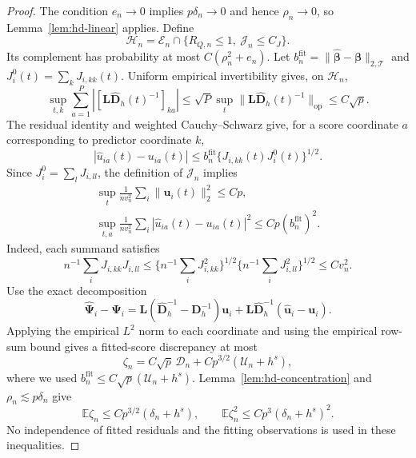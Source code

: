 \documentclass[12pt]{article}
\newcommand{\bu}{{\mathbf u}}
\newcommand{\bD}{{\mathbf D}}
\newcommand{\bL}{{\mathbf L}}
\newcommand{\bbeta}  {\boldsymbol{\beta}}
\newcommand{\bPsi} {\boldsymbol{\Psi}}
\newcommand{\expect}{\mathbb{E}}
\numberwithin{equation}{section}
\begin{document}
\begin{proof}
The condition $e_n\to0$ implies $p\delta_n\to0$ and hence
$\rho_n\to0$, so
Lemma~\ref{lem:hd-linear} applies.  Define
\[
\mathcal H_n=\mathcal E_n\cap\{R_{Q,n}\le1,
\ \mathcal J_n\le C_J\}.
\]
Its complement has probability at most $C(\rho_n^2+e_n)$.
Let $b_n^{\mathrm{fit}}=
\|\widehat{\bbeta}-\bbeta\|_{2,\mathcal T}$ and
$J_i^0(t)=\sum_kJ_{i,kk}(t)$.
Uniform empirical invertibility gives, on $\mathcal H_n$,
\[
\sup_{t,k}\sum_{a=1}^P|[\bL\widehat{\bD}_h(t)^{-1}]_{ka}|
\le\sqrt P\sup_t\|\bL\widehat{\bD}_h(t)^{-1}\|_{\mathrm{op}}
\le C\sqrt p.
\]
The residual identity and weighted Cauchy--Schwarz give, for a score
coordinate $a$ corresponding to predictor coordinate $k$,
\[
|\widehat u_{ia}(t)-u_{ia}(t)|
\le b_n^{\mathrm{fit}}\{J_{i,kk}(t)J_i^0(t)\}^{1/2}.
\]
Since $J_i^0=\sum_lJ_{i,ll}$, the definition of $\mathcal J_n$ implies
\[
\begin{gathered}
\sup_t\frac1{nv_n^2}\sum_i\|\bu_i(t)\|_2^2\le Cp,\\
\sup_{t,a}\frac1{nv_n^2}\sum_i
|\widehat u_{ia}(t)-u_{ia}(t)|^2
\le Cp(b_n^{\mathrm{fit}})^2.
\end{gathered}
\]
Indeed, each summand satisfies
\[
n^{-1}\sum_iJ_{i,kk}J_{i,ll}
\le \{n^{-1}\sum_iJ_{i,kk}^2\}^{1/2}
\{n^{-1}\sum_iJ_{i,ll}^2\}^{1/2}\le Cv_n^2.
\]
Use the exact decomposition
\[
\widehat{\bPsi}_i-\bPsi_i
=\bL(\widehat{\bD}_h^{-1}-\bD_h^{-1})\bu_i
+\bL\widehat{\bD}_h^{-1}(\widehat\bu_i-\bu_i).
\]
Applying the empirical $L^2$ norm to each coordinate and using
the empirical row-sum bound gives a fitted-score discrepancy at most
\[
\zeta_n=C\sqrt p\,\mathcal D_n
+Cp^{3/2}(\mathcal U_n+h^s),
\]
where we used $b_n^{\mathrm{fit}}\le C\sqrt p(\mathcal U_n+h^s)$.
Lemma~\ref{lem:hd-concentration} and $\rho_n\lesssim p\delta_n$ give
\[
\expect\zeta_n\le Cp^{3/2}(\delta_n+h^s),\qquad
\expect\zeta_n^2\le Cp^3(\delta_n+h^s)^2.
\]
No independence of fitted residuals and the fitting observations is
used in these inequalities.


\end{proof}
\end{document}
